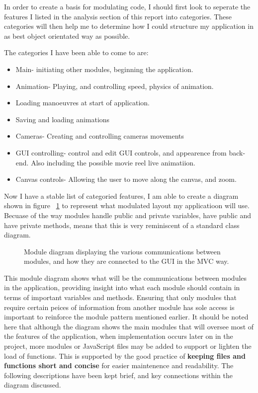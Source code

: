 In order to create a basis for modulating code, I should first look to seperate the features I listed in the analysis section of this report into categories. These categories will then help me to determine how I could structure my application in as best object orientated way as possible.

The categories I have been able to come to are:
\begin{itemize}
  \item Main- initiating other modules, beginning the application.
  \item Animation- Playing, and controlling speed, physics of animation.
  \item Loading manoeuvres at start of application.
  \item Saving and loading animations
  \item Cameras- Creating and controlling cameras movements
  \item GUI controlling- control and edit GUI controls, and appearence from back-end. Also including the possible movie reel live animatiion.
  \item Canvas controls- Allowing the user to move along the canvas, and zoom.
\end{itemize}

Now I have a stable list of categoried features, I am able to create a diagram shown in figure ~\ref{fig:mod} to represent what modulated layout my applicatioon will use. Becuase of the way modules handle public and private variables, have public and have private methods, means that this is very reminiscent of a standard class diagram.

\begin{figure}[h!]
  \centering
  \caption{Module diagram displaying the various communications between modules, and how they are connected to the GUI in the MVC way.}
  \label{fig:mod}
\end{figure}

This module diagram shows what will be the communications between modules in the application, providing insight into what each module should contain in terms of important variables and methods. Ensuring that only modules that require certain peices of information from another module has sole access is important to reinforce the module pattern mentioned earlier. It should be noted here that although the diagram shows the main modules that will oversee most of the features of the application, when implementation occurs later on in the project, more modules or JavaScript files may be added to support or lighten the load of functions. This is supported by the good practice of \textbf{keeping files and functions short and concise} for easier maintenence and readability. The following descriptions have been kept brief, and key connections within the diagram discussed.

